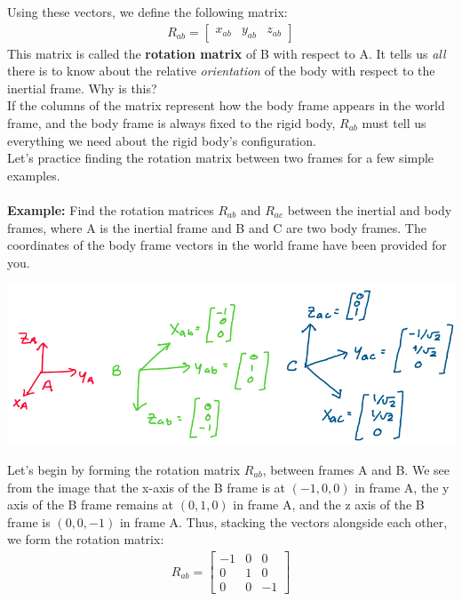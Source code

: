 \documentclass[oneside]{book}
\begin{document}
Using these vectors, we define the following matrix:
\begin{align}
    R_{ab} = 
    \begin{bmatrix}
    x_{ab} & y_{ab} & z_{ab}
    \end{bmatrix}
\end{align}
This matrix is called the \textbf{rotation matrix} of B with respect to A. It tells us \textit{all} there is to know about the relative \textit{orientation} of the body with respect to the inertial frame. Why is this?\\
If the columns of the matrix represent how the body frame appears in the world frame, and the body frame is always fixed to the rigid body, $R_{ab}$ must tell us everything we need about the rigid body's configuration.\\
Let's practice finding the rotation matrix between two frames for a few simple examples. \\\\
\textbf{Example: }Find the rotation matrices $R_{ab}$ and $R_{ac}$ between the inertial and body frames, where A is the inertial frame and B and C are two body frames. The coordinates of the body frame vectors in the world frame have been provided for you.
\begin{center}
    \includegraphics[scale=0.3]{images/examplerot.png}
\end{center}
Let's begin by forming the rotation matrix $R_{ab}$, between frames A and B. We see from the image that the x-axis of the B frame is at $(-1, 0, 0)$ in frame A, the y axis of the B frame remains at $(0, 1, 0)$ in frame A, and the z axis of the B frame is $(0, 0, -1)$ in frame A. Thus, stacking the vectors alongside each other, we form the rotation matrix:
\begin{align}
    R_{ab} = \begin{bmatrix}
    -1 & 0 & 0\\
    0 & 1 & 0\\
    0 & 0 & -1
    \end{bmatrix}
\end{align}
\end{document}
